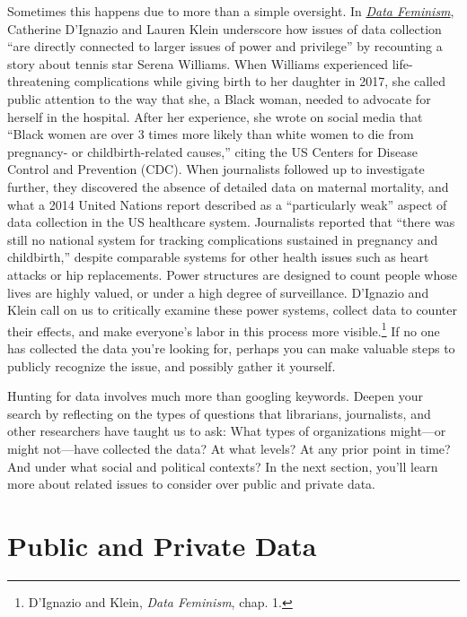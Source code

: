 \documentclass[
  english,
]{book}
\begin{document}
Sometimes this happens due to more than a simple oversight. In \emph{\href{https://data-feminism.mitpress.mit.edu/}{Data Feminism}}, Catherine D'Ignazio and Lauren Klein underscore how issues of data collection ``are directly connected to larger issues of power and privilege'' by recounting a story about tennis star Serena Williams. When Williams experienced life-threatening complications while giving birth to her daughter in 2017, she called public attention to the way that she, a Black woman, needed to advocate for herself in the hospital. After her experience, she wrote on social media that ``Black women are over 3 times more likely than white women to die from pregnancy- or childbirth-related causes,'' citing the US Centers for Disease Control and Prevention (CDC). When journalists followed up to investigate further, they discovered the absence of detailed data on maternal mortality, and what a 2014 United Nations report described as a ``particularly weak'' aspect of data collection in the US healthcare system. Journalists reported that ``there was still no national system for tracking complications sustained in pregnancy and childbirth,'' despite comparable systems for other health issues such as heart attacks or hip replacements. Power structures are designed to count people whose lives are highly valued, or under a high degree of surveillance. D'Ignazio and Klein call on us to critically examine these power systems, collect data to counter their effects, and make everyone's labor in this process more visible.\footnote{D'Ignazio and Klein, \emph{Data {Feminism}}, chap. 1.} If no one has collected the data you're looking for, perhaps you can make valuable steps to publicly recognize the issue, and possibly gather it yourself.

Hunting for data involves much more than googling keywords. Deepen your search by reflecting on the types of questions that librarians, journalists, and other researchers have taught us to ask: What types of organizations might---or might not---have collected the data? At what levels? At any prior point in time? And under what social and political contexts? In the next section, you'll learn more about related issues to consider over public and private data.

\hypertarget{public}{%
\section*{Public and Private Data}\label{public}}
\end{document}
